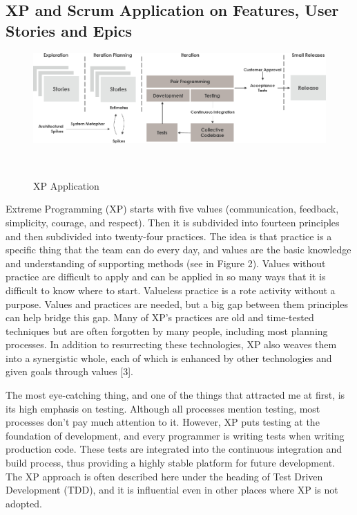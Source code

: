 \documentclass{sigchi}
\begin{document}
\subsection{XP and Scrum Application on Features, User Stories and Epics}

\begin{figure}
\centering
  \includegraphics[width=0.9\columnwidth]{figures/xp}
  \caption{XP Application }~\label{fig:figure1}
\end{figure}

Extreme Programming (XP) starts with five values (communication, feedback, simplicity, courage, and respect). Then it is subdivided into fourteen principles and then subdivided into twenty-four practices. The idea is that practice is a specific thing that the team can do every day, and values are the basic knowledge and understanding of supporting methods (see in Figure 2). Values without practice are difficult to apply and can be applied in so many ways that it is difficult to know where to start. Valueless practice is a rote activity without a purpose. Values and practices are needed, but a big gap between them principles can help bridge this gap. Many of XP's practices are old and time-tested techniques but are often forgotten by many people, including most planning processes. In addition to resurrecting these technologies, XP also weaves them into a synergistic whole, each of which is enhanced by other technologies and given goals through values [3].

The most eye-catching thing, and one of the things that attracted me at first, is its high emphasis on testing. Although all processes mention testing, most processes don't pay much attention to it. However, XP puts testing at the foundation of development, and every programmer is writing tests when writing production code. These tests are integrated into the continuous integration and build process, thus providing a highly stable platform for future development. The XP approach is often described here under the heading of Test Driven Development (TDD), and it is influential even in other places where XP is not adopted.
\end{document}

